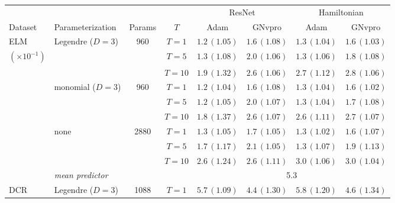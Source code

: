 \begin{tabular}{llcccccc}
\toprule
& & & & \multicolumn{2}{c}{ResNet} & \multicolumn{2}{c}{Hamiltonian} \\
\cmidrule(lr){5-6} \cmidrule(lr){7-8}
Dataset & Parameterization & Params & $T$ & Adam & GNvpro & Adam & GNvpro \\
\midrule
\cmidrule(lr){2-8}
ELM & \multirow{3}{*}{Legendre ($D=3$)} & \multirow{3}{*}{960} & $T=1$ & $1.2\,(1.05)$ & $1.6\,(1.08)$ & $1.3\,(1.04)$ & $1.6\,(1.03)$ \\  %
$(\times 10^{-1})$ & &  & $T=5$ & $1.3\,(1.08)$ & $2.0\,(1.06)$ & $1.3\,(1.06)$ & $1.8\,(1.08)$ \\  %
 & &  & $T=10$ & $1.9\,(1.32)$ & $2.6\,(1.06)$ & $2.7\,(1.12)$ & $2.8\,(1.06)$ \\  %
\cmidrule(lr){2-8}
 & \multirow{3}{*}{monomial ($D=3$)} & \multirow{3}{*}{960} & $T=1$ & $1.2\,(1.04)$ & $1.6\,(1.08)$ & $1.3\,(1.04)$ & $1.6\,(1.02)$ \\  %
 & &  & $T=5$ & $1.2\,(1.05)$ & $2.0\,(1.07)$ & $1.3\,(1.04)$ & $1.7\,(1.08)$ \\  %
 & &  & $T=10$ & $1.8\,(1.37)$ & $2.6\,(1.07)$ & $2.6\,(1.11)$ & $2.7\,(1.07)$ \\  %
\cmidrule(lr){2-8}
 & \multirow{3}{*}{none} & \multirow{3}{*}{2880} & $T=1$ & $1.3\,(1.05)$ & $1.7\,(1.05)$ & $1.3\,(1.02)$ & $1.6\,(1.07)$ \\  %
 & &  & $T=5$ & $1.7\,(1.17)$ & $2.1\,(1.05)$ & $1.3\,(1.07)$ & $1.9\,(1.13)$ \\  %
 & &  & $T=10$ & $2.6\,(1.24)$ & $2.6\,(1.11)$ & $3.0\,(1.06)$ & $3.0\,(1.04)$ \\  %
\cmidrule(lr){2-8}
& \emph{mean predictor} & & & \multicolumn{4}{c}{5.3} \\
\midrule
\cmidrule(lr){2-8}
DCR & \multirow{3}{*}{Legendre ($D=3$)} & \multirow{3}{*}{1088} & $T=1$ & $5.7\,(1.09)$ & $4.4\,(1.30)$ & $5.8\,(1.20)$ & $4.6\,(1.34)$ \\  %

\end{tabular}

